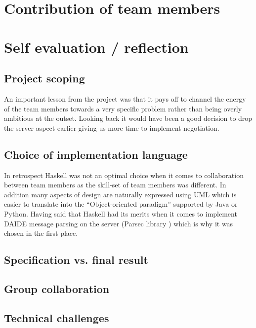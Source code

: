 \documentclass[11pt]{article} \usepackage{fullpage} \usepackage{cite}
\begin{document}
\section{Contribution of team members}

\section{Self evaluation / reflection}

\subsection{Project scoping}

An important lesson from the project was that it pays off to channel the
energy of the team members towards a very specific problem rather than 
being overly ambitious at the outset. Looking back it would have been a good
decision to drop the server aspect earlier giving us more time to implement
negotiation. 

\subsection{Choice of implementation language}

In retrospect Haskell was not an optimal choice when it comes to collaboration
between team members as the skill-set of team members was different. In addition
many aspects of design are naturally expressed using UML which is easier to 
translate into the ``Object-oriented paradigm'' supported by Java or Python. 
Having said that Haskell had its merits when it comes to implement DAIDE
message parsing on the server (Parsec library \cite{ParsecLib}) which is why
it was chosen in the first place.  


\subsection{Specification vs. final result}

\subsection{Group collaboration}

\subsection{Technical challenges}

\end{document}
